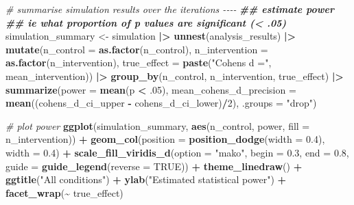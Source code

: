 \documentclass[
]{article}
\newenvironment{Shaded}{\begin{snugshade}}{\end{snugshade}}
\newcommand{\AttributeTok}[1]{\textcolor[rgb]{0.13,0.29,0.53}{#1}}
\newcommand{\CommentTok}[1]{\textcolor[rgb]{0.56,0.35,0.01}{\textit{#1}}}
\newcommand{\ConstantTok}[1]{\textcolor[rgb]{0.56,0.35,0.01}{#1}}
\newcommand{\DecValTok}[1]{\textcolor[rgb]{0.00,0.00,0.81}{#1}}
\newcommand{\DocumentationTok}[1]{\textcolor[rgb]{0.56,0.35,0.01}{\textbf{\textit{#1}}}}
\newcommand{\FloatTok}[1]{\textcolor[rgb]{0.00,0.00,0.81}{#1}}
\newcommand{\FunctionTok}[1]{\textcolor[rgb]{0.13,0.29,0.53}{\textbf{#1}}}
\newcommand{\NormalTok}[1]{#1}
\newcommand{\OtherTok}[1]{\textcolor[rgb]{0.56,0.35,0.01}{#1}}
\newcommand{\SpecialCharTok}[1]{\textcolor[rgb]{0.81,0.36,0.00}{\textbf{#1}}}
\newcommand{\StringTok}[1]{\textcolor[rgb]{0.31,0.60,0.02}{#1}}
\begin{document}
\begin{Shaded}
\begin{Highlighting}[]
\CommentTok{\# summarise simulation results over the iterations {-}{-}{-}{-}}
\DocumentationTok{\#\# estimate power  }
\DocumentationTok{\#\# ie what proportion of p values are significant (\textless{} .05)}
\NormalTok{simulation\_summary }\OtherTok{\textless{}{-}}\NormalTok{ simulation }\SpecialCharTok{|\textgreater{}}
  \FunctionTok{unnest}\NormalTok{(analysis\_results) }\SpecialCharTok{|\textgreater{}}
  \FunctionTok{mutate}\NormalTok{(}\AttributeTok{n\_control =} \FunctionTok{as.factor}\NormalTok{(n\_control),}
         \AttributeTok{n\_intervention =} \FunctionTok{as.factor}\NormalTok{(n\_intervention),}
         \AttributeTok{true\_effect =} \FunctionTok{paste}\NormalTok{(}\StringTok{"Cohen\textquotesingle{}s d ="}\NormalTok{, mean\_intervention)) }\SpecialCharTok{|\textgreater{}}
  \FunctionTok{group\_by}\NormalTok{(n\_control,}
\NormalTok{           n\_intervention,}
\NormalTok{           true\_effect) }\SpecialCharTok{|\textgreater{}}
  \FunctionTok{summarize}\NormalTok{(}\AttributeTok{power =} \FunctionTok{mean}\NormalTok{(p }\SpecialCharTok{\textless{}}\NormalTok{ .}\DecValTok{05}\NormalTok{), }
            \AttributeTok{mean\_cohens\_d\_precision =} \FunctionTok{mean}\NormalTok{((cohens\_d\_ci\_upper }\SpecialCharTok{{-}}\NormalTok{ cohens\_d\_ci\_lower)}\SpecialCharTok{/}\DecValTok{2}\NormalTok{),}
            \AttributeTok{.groups =} \StringTok{"drop"}\NormalTok{)}

\CommentTok{\# plot power}
\FunctionTok{ggplot}\NormalTok{(simulation\_summary, }\FunctionTok{aes}\NormalTok{(n\_control, power, }\AttributeTok{fill =}\NormalTok{ n\_intervention)) }\SpecialCharTok{+}
  \FunctionTok{geom\_col}\NormalTok{(}\AttributeTok{position =} \FunctionTok{position\_dodge}\NormalTok{(}\AttributeTok{width =} \FloatTok{0.4}\NormalTok{), }\AttributeTok{width =} \FloatTok{0.4}\NormalTok{) }\SpecialCharTok{+}
  \FunctionTok{scale\_fill\_viridis\_d}\NormalTok{(}\AttributeTok{option =} \StringTok{"mako"}\NormalTok{, }\AttributeTok{begin =} \FloatTok{0.3}\NormalTok{, }\AttributeTok{end =} \FloatTok{0.8}\NormalTok{, }
                       \AttributeTok{guide =} \FunctionTok{guide\_legend}\NormalTok{(}\AttributeTok{reverse =} \ConstantTok{TRUE}\NormalTok{)) }\SpecialCharTok{+}
  \FunctionTok{theme\_linedraw}\NormalTok{() }\SpecialCharTok{+}
  \FunctionTok{ggtitle}\NormalTok{(}\StringTok{"All conditions"}\NormalTok{) }\SpecialCharTok{+}
  \FunctionTok{ylab}\NormalTok{(}\StringTok{"Estimated statistical power"}\NormalTok{) }\SpecialCharTok{+}
  \FunctionTok{facet\_wrap}\NormalTok{(}\SpecialCharTok{\textasciitilde{}}\NormalTok{ true\_effect)}
\end{Highlighting}
\end{Shaded}
\end{document}
